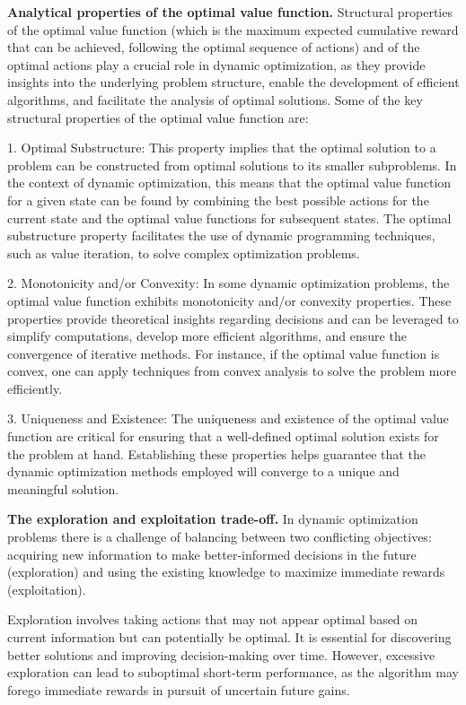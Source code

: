 \documentclass[letter,11pt]{article}
\begin{document}
\textbf{Analytical properties of the optimal value function.} 
Structural properties of the optimal value function (which is the maximum expected cumulative reward that can be achieved, following the optimal sequence of actions) and of the optimal actions play a crucial role in dynamic optimization, as they provide insights into the underlying problem structure, enable the development of efficient algorithms, and facilitate the analysis of optimal solutions. Some of the key structural properties of the optimal value function are:

1. Optimal Substructure: This property implies that the optimal solution to a problem can be constructed from optimal solutions to its smaller subproblems. In the context of dynamic optimization, this means that the optimal value function for a given state can be found by combining the best possible actions for the current state and the optimal value functions for subsequent states. The optimal substructure property facilitates the use of dynamic programming techniques, such as value iteration, to solve complex optimization problems.


2. Monotonicity and/or Convexity: In some dynamic optimization problems, the optimal value function exhibits monotonicity and/or convexity properties. These properties provide theoretical insights regarding decisions and can be leveraged to simplify computations, develop more efficient algorithms, and ensure the convergence of iterative methods. For instance, if the optimal value function is convex, one can apply techniques from convex analysis to solve the problem more efficiently.

3. Uniqueness and Existence: The uniqueness and existence of the optimal value function are critical for ensuring that a well-defined optimal solution exists for the problem at hand. Establishing these properties helps guarantee that the dynamic optimization methods employed will converge to a unique and meaningful solution.


\textbf{The exploration and exploitation trade-off.} In dynamic optimization problems there is a  challenge of balancing between two conflicting objectives: acquiring new information to make better-informed decisions in the future (exploration) and using the existing knowledge to maximize immediate rewards (exploitation).

Exploration involves taking actions that may not appear optimal based on current information but can potentially be optimal. It is essential for discovering better solutions and improving decision-making over time. However, excessive exploration can lead to suboptimal short-term performance, as the algorithm may forego immediate rewards in pursuit of uncertain future gains.
\end{document}
